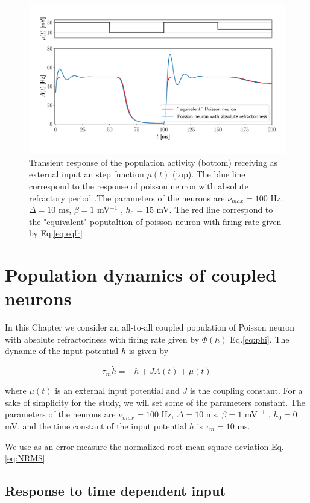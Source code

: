\documentclass[12pt,twoside]{report}
\begin{document}
\begin{figure}[h!]
	\centering
	\includegraphics[width=0.7\linewidth]{refractory_rep.pdf}
	\caption{Transient response of the population activity (bottom) receiving as external input an step function $\mu(t)$ (top). The blue line correspond to the response of poisson neuron with absolute refractory period .The parameters of the neurons are $\nu_{max}=100$ Hz, $\Delta=10$ ms, $\beta=1$ mV$^{-1}$ , $h_0=15$ mV. The red line correspond to the "equivalent" poputaltion of poisson neuron with firing rate given by Eq.\eqref{eq:eqfr}
	}
	\label{fig:refractory_rep}
\end{figure}




\chapter{Population dynamics of coupled neurons}
\label{chap:coupled}

In this Chapter we consider an all-to-all coupled population of Poisson neuron with absolute refractoriness with firing rate given by $\Phi(h)$ Eq.\ref{eq:phi}. The dynamic of the input potential $h$ is given by

\begin{equation}
\label{eq:h2}
\tau_m\dot{h}=-h+JA(t)+\mu(t)
\end{equation}

where $\mu(t)$ is an external input potential and $J$ is the coupling constant. For a sake of simplicity for the study, we will set some of the parameters constant. The parameters of the neurons are $\nu_{max}=100$ Hz, $\Delta=10$ ms, $\beta=1$ mV$^{-1}$ , $h_0=0$ mV, and the time constant of the input potential $h$ is $\tau_m=10$ ms.


We use as an error measure the normalized root-mean-square deviation Eq.\eqref{eq:NRMS}

\section{Response to time dependent input}
\end{document}
